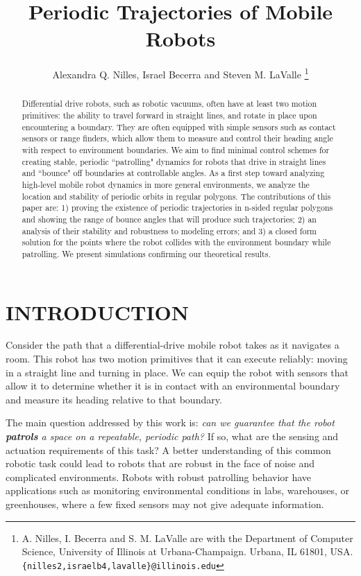 \documentclass[letterpaper, 10 pt, conference]{ieeeconf}  %
\title{\LARGE \bf
Periodic Trajectories of Mobile Robots}
\author{Alexandra Q. Nilles, Israel Becerra and Steven M. LaValle%
\thanks{A. Nilles, I. Becerra and S. M. LaValle are with the Department of Computer Science, 
University of Illinois at Urbana-Champaign. Urbana, IL 61801, USA. 
        {\tt\small \{nilles2,israelb4,lavalle\}@illinois.edu}}%
}
\begin{document}
\maketitle
\thispagestyle{empty}
\pagestyle{empty}


\begin{abstract}


Differential drive robots, such as robotic vacuums, often
have at least two motion primitives: the ability to travel forward in straight
lines, and rotate in place upon encountering a boundary. They are often equipped
with simple sensors such as contact sensors or range finders, which allow them
to measure and control their heading angle with respect to environment
boundaries.
We aim to find minimal control schemes for creating stable, periodic
``patrolling" dynamics for robots that drive in straight lines and ``bounce" off
boundaries at
controllable angles. As a first step toward analyzing high-level mobile robot
dynamics in more general environments, we analyze the location and stability of
periodic orbits in regular polygons.
The contributions of this paper are:
1) proving the existence of periodic trajectories in n-sided regular polygons
and showing the range of bounce angles that will produce such trajectories;
2) an analysis of their stability and robustness to
modeling errors; and
3) a closed form solution for the points where the robot
collides with the environment boundary while patrolling.
We present simulations confirming our theoretical results.

\end{abstract}


\section{INTRODUCTION}

Consider the path that a differential-drive mobile robot takes as it navigates a room.
This robot has two motion primitives that it can execute reliably: moving in a straight
line and turning in place. We can equip the robot with sensors that allow it to
determine whether it is in contact with an environmental boundary and measure
its heading relative to that boundary.

The main question addressed by this work is: \textit{can we guarantee that the robot 
\textbf{patrols} a space on a repeatable, periodic path?} If so, what are the
 sensing and actuation requirements of this task? A better understanding of
this common robotic task could lead to robots that are robust in the face of
noise and complicated environments. Robots with
robust patrolling behavior have applications such as
monitoring environmental conditions in labs, warehouses, or greenhouses, where
a few fixed sensors may not give adequate information.
\end{document}
